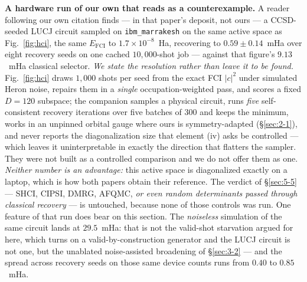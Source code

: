 \documentclass[onecolumn,a4paper]{quantumarticle}
\begin{document}
\textbf{A hardware run of our own that reads as a counterexample.} A reader following our own citation \cite{bonilla2026spectral} finds --- in that paper's deposit, not ours --- a CCSD-seeded LUCJ circuit sampled on \texttt{ibm\_marrakesh} on the same active space as Fig.~\ref{fig:hci}, the same $E_{\mathrm{FCI}}$ to $1.7\times10^{-8}$~Ha, recovering to $0.59\pm0.14$~mHa over eight recovery seeds on one cached $10{,}000$-shot job --- against that figure's $9.13$~mHa classical selector. \emph{We state the resolution rather than leave it to be found.} Fig.~\ref{fig:hci} draws $1{,}000$ shots per seed from the exact FCI $|c|^2$ under simulated Heron noise, repairs them in a \emph{single} occupation-weighted pass, and scores a fixed $D{=}120$ subspace; the companion samples a physical circuit, runs \emph{five} self-consistent recovery iterations over five batches of $300$ and keeps the minimum, works in an unpinned orbital gauge where ours is symmetry-adapted (\S\ref{sec:2-1}), and never reports the diagonalization size that element (iv) asks be controlled --- which leaves it uninterpretable in exactly the direction that flatters the sampler. They were not built as a controlled comparison and we do not offer them as one. \emph{Neither number is an advantage:} this active space is diagonalized exactly on a laptop, which is how both papers obtain their reference. The verdict of \S\ref{sec:5-5} --- SHCI, CIPSI, DMRG, AFQMC, \emph{or even random determinants passed through classical recovery} --- is untouched, because none of those controls was run. One feature of that run does bear on this section. The \emph{noiseless} simulation of the same circuit lands at $29.5$~mHa: that is not the valid-shot starvation argued for here, which turns on a valid-by-construction generator and the LUCJ circuit is not one, but the unablated noise-assisted broadening of \S\ref{sec:3-2} --- and the spread across recovery seeds on those same device counts runs from $0.40$ to $0.85$~mHa.
\end{document}
